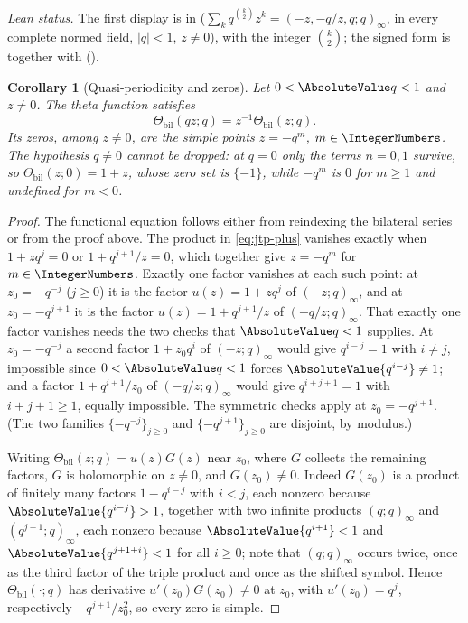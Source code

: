 \documentclass[11pt,a4paper,oneside,openany]{book}
\newtheorem{corollary}[corollary]{Corollary}
\theoremstyle{definition}
\theoremstyle{remark}
\newcommand{\BilateralTheta}[2]{\Theta_{\mathrm{bil}}\!\left(#1;#2\right)}
\begin{document}
\emph{Lean status.}  The first display is  in
 ($\sum_kq^{\binom k2}z^k=(-z,-q/z,q;q)_\infty$, in every
complete normed field, $|q|<1$, $z\ne0$), with  the integer
$\binom k2$; the signed form is  together with
 ().


\begin{corollary}[Quasi-periodicity and zeros]\label{cor:theta-quasi}
Let $0<\AbsoluteValue q<1$ and $z\ne0$.  The theta function satisfies
\[
 \BilateralTheta{qz}{q}=z^{-1}\BilateralTheta{z}{q}.
\]
Its zeros, among $z\ne0$, are the simple points $z=-q^m$, $m\in\IntegerNumbers$.
The hypothesis $q\ne0$ cannot be dropped: at $q=0$ only the terms $n=0,1$ survive, so
$\BilateralTheta{z}{0}=1+z$, whose zero set is $\{-1\}$, while $-q^m$ is $0$ for $m\ge1$ and
undefined for $m<0$.
\end{corollary}

\begin{proof}
The functional equation follows either from reindexing the bilateral series or from the proof above.  The product in \eqref{eq:jtp-plus} vanishes exactly when $1+zq^j=0$ or $1+q^{j+1}/z=0$, which together give $z=-q^m$ for $m\in\IntegerNumbers$.  Exactly one factor vanishes at each such point: at $z_0=-q^{-j}$ ($j\ge0$) it is the factor $u(z)=1+zq^{j}$ of $(-z;q)_\infty$, and at $z_0=-q^{j+1}$ it is the factor $u(z)=1+q^{j+1}/z$ of $(-q/z;q)_\infty$.  That exactly one factor vanishes needs the two checks that $\AbsoluteValue q<1$ supplies.  At
$z_0=-q^{-j}$ a second factor $1+z_0q^{i}$ of $(-z;q)_\infty$ would give $q^{i-j}=1$ with
$i\ne j$, impossible since $0<\AbsoluteValue q<1$ forces $\AbsoluteValue{q^{i-j}}\ne1$; and a
factor $1+q^{i+1}/z_0$ of $(-q/z;q)_\infty$ would give $q^{i+j+1}=1$ with $i+j+1\ge1$, equally
impossible.  The symmetric checks apply at $z_0=-q^{j+1}$.  (The two families
$\{-q^{-j}\}_{j\ge0}$ and $\{-q^{j+1}\}_{j\ge0}$ are disjoint, by modulus.)

Writing $\BilateralTheta{z}{q}=u(z)G(z)$ near $z_0$, where $G$ collects the remaining factors,
$G$ is holomorphic on $z\ne0$, and $G(z_0)\ne0$.  Indeed $G(z_0)$ is a product of finitely many
factors $1-q^{i-j}$ with $i<j$, each nonzero because $\AbsoluteValue{q^{i-j}}>1$, together with
two infinite products $(q;q)_\infty$ and $(q^{j+1};q)_\infty$, each nonzero because
$\AbsoluteValue{q^{i+1}}<1$ and $\AbsoluteValue{q^{j+1+i}}<1$ for all $i\ge0$; note that
$(q;q)_\infty$ occurs twice, once as the third factor of the triple product and once as the
shifted symbol.  Hence $\BilateralTheta{\cdot}{q}$ has derivative $u'(z_0)G(z_0)\ne0$ at $z_0$,
with $u'(z_0)=q^{j}$, respectively $-q^{j+1}/z_0^{2}$, so every zero is simple.
\end{proof}
\end{document}
